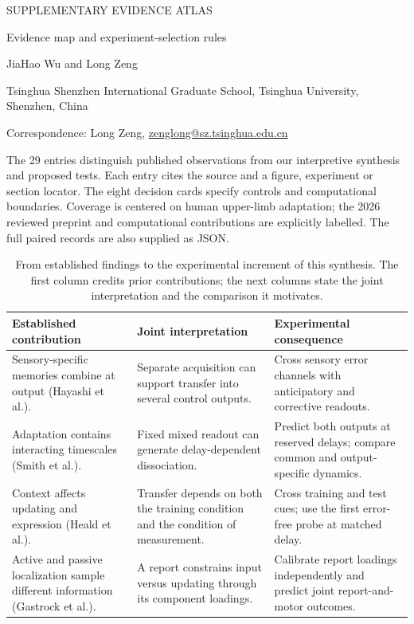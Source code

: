 \documentclass[11pt,a4paper]{article}
\begin{document}
{\small\sffamily\color{navy} SUPPLEMENTARY EVIDENCE ATLAS}\par\medskip
{\LARGE\bfseries\raggedright Evidence map and experiment-selection rules\par}\bigskip
{\normalsize JiaHao Wu and Long Zeng\par}
{\small Tsinghua Shenzhen International Graduate School, Tsinghua University, Shenzhen, China\par}\medskip
{}
{\small Correspondence: Long Zeng, \href{mailto:zenglong@sz.tsinghua.edu.cn}{zenglong@sz.tsinghua.edu.cn}\par}\medskip
The 29 entries distinguish published observations from our interpretive synthesis and proposed tests. Each entry cites the source and a figure, experiment or section locator. The eight decision cards specify controls and computational boundaries. Coverage is centered on human upper-limb adaptation; the 2026 reviewed preprint and computational contributions are explicitly labelled. The full paired records are also supplied as JSON.
\begin{table}[!htbp]\small\caption{From established findings to the experimental increment of this synthesis. The first column credits prior contributions; the next columns state the joint interpretation and the comparison it motivates.}\label{tab:synthesis}
\begin{tabularx}{\textwidth}{>{\raggedright\arraybackslash}X>{\raggedright\arraybackslash}X>{\raggedright\arraybackslash}X}\toprule
\textbf{Established contribution} & \textbf{Joint interpretation} & \textbf{Experimental consequence}\\\midrule
Sensory-specific memories combine at output (Hayashi et al.). & Separate acquisition can support transfer into several control outputs. & Cross sensory error channels with anticipatory and corrective readouts.\\[6pt]
Adaptation contains interacting timescales (Smith et al.). & Fixed mixed readout can generate delay-dependent dissociation. & Predict both outputs at reserved delays; compare common and output-specific dynamics.\\[6pt]
Context affects updating and expression (Heald et al.). & Transfer depends on both the training condition and the condition of measurement. & Cross training and test cues; use the first error-free probe at matched delay.\\[6pt]
Active and passive localization sample different information (Gastrock et al.). & A report constrains input versus updating through its component loadings. & Calibrate report loadings independently and predict joint report-and-motor outcomes.\\[6pt]
\bottomrule\end{tabularx}\end{table}
\end{document}
